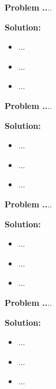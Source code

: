 \documentclass{article}
\theoremstyle{problemstyle}
\newenvironment{boxedproblem}[1]
{\begin{tcolorbox}[colback=white, colframe=black, boxrule=0.5pt]\noindent\textbf{Problem #1.}}
{\end{tcolorbox}}
\begin{document}
    
    \begin{boxedproblem}{28}
    ...
    \end{boxedproblem}
    
    \textbf{Solution:}
    \begin{itemize}[label={},leftmargin=1.25cm,nosep]
        \item ...
        \item ...
        \item ...
    \end{itemize}
    
    
    \begin{boxedproblem}{29}
    ...
    \end{boxedproblem}
    
    \textbf{Solution:}
    \begin{itemize}[label={},leftmargin=1.25cm,nosep]
        \item ...
        \item ...
        \item ...
    \end{itemize}
    
    
    \begin{boxedproblem}{30}
    ...
    \end{boxedproblem}
    
    \textbf{Solution:}
    \begin{itemize}[label={},leftmargin=1.25cm,nosep]
        \item ...
        \item ...
        \item ...
    \end{itemize}
    
    
\begin{boxedproblem}{31}
    ...
    \end{boxedproblem}
    
    \textbf{Solution:}
    \begin{itemize}[label={},leftmargin=1.25cm,nosep]
        \item ...
        \item ...
        \item ...
    \end{itemize}
    
\end{document}
